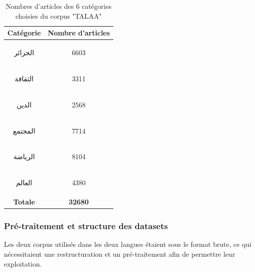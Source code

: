 \begin{itemize}
                \begin{table}[H]
                    \begin{center}
                        \begin{tabular}{|c|c|}
                            \hline
                            \textbf{Catégorie} &  \textbf{Nombre d'articles} \\
                            \hline
                            \begin{arab}الجزائر\end{arab} & 6603 \\
                            \begin{arab}الثقافة\end{arab} & 3311 \\
                            \begin{arab}الدين\end{arab} & 2568 \\
                            \begin{arab}المجتمع\end{arab} & 7714 \\
                            \begin{arab}الرياضة\end{arab} & 8104 \\
                            \begin{arab}العالم\end{arab} & 4380 \\
                            \textbf{Totale} & \textbf{32680} \\
                            \hline
                        \end{tabular}
                    \end{center}
                    \caption{Nombres d'articles des 6 catégories choisies du corpus "TALAA"}
                    \label{talaa-categ}
                \end{table}
            \end{itemize}
        \subsubsection{Pré-traitement et structure des datasets}
            Les deux corpus utilisés dans les deux langues étaient sous le format brute, ce qui nécessitaient une restructuration et un pré-traitement afin de permettre leur exploitation.  

